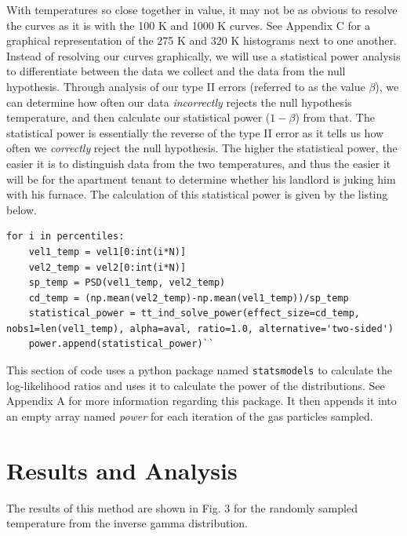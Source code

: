 \documentclass[%
 reprint,
 amsmath,amssymb,
 aps,
]{revtex4-2}
\begin{document}
With temperatures so close together in value, it may not be as obvious to resolve the curves as it is with the 100 K and 1000 K curves. See Appendix C for a graphical representation of the 275 K and 320 K histograms next to one another. Instead of resolving our curves graphically, we will use a statistical power analysis to differentiate between the data we collect and the data from the null hypothesis. Through analysis of our type II errors (referred to as the value $\beta$), we can determine how often our data \textit{incorrectly} rejects the null hypothesis temperature, and then calculate our statistical power ($1-\beta$) from that. The statistical power is essentially the reverse of the type II error as it tells us how often we \textit{correctly} reject the null hypothesis. The higher the statistical power, the easier it is to distinguish data from the two temperatures, and thus the easier it will be for the apartment tenant to determine whether his landlord is juking him with his furnace. The calculation of this statistical power is given by the listing below.

\begin{lstlisting}
for i in percentiles:
	vel1_temp = vel1[0:int(i*N)]
	vel2_temp = vel2[0:int(i*N)]
	sp_temp = PSD(vel1_temp, vel2_temp)
	cd_temp = (np.mean(vel2_temp)-np.mean(vel1_temp))/sp_temp
	statistical_power = tt_ind_solve_power(effect_size=cd_temp, nobs1=len(vel1_temp), alpha=aval, ratio=1.0, alternative='two-sided')
	power.append(statistical_power)``
\end{lstlisting}
This section of code uses a python package named \lstinline{statsmodels} to calculate the log-likelihood ratios and uses it to calculate the power of the distributions. See Appendix A for more information regarding this package. It then appends it into an empty array named \textit{power} for each iteration of the gas particles sampled.

\section{Results and Analysis}

The results of this method are shown in Fig. 3 for the randomly sampled temperature from the inverse gamma distribution.
\end{document}

